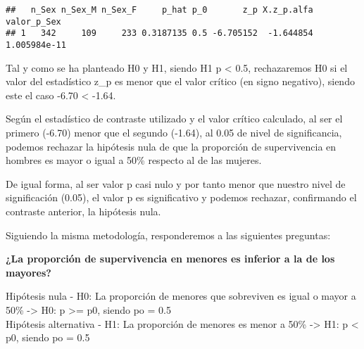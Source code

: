 \documentclass[
]{article}
\begin{document}
\begin{verbatim}
##   n_Sex n_Sex_M n_Sex_F     p_hat p_0       z_p X.z_p.alfa  valor_p_Sex
## 1   342     109     233 0.3187135 0.5 -6.705152  -1.644854 1.005984e-11
\end{verbatim}

Tal y como se ha planteado H0 y H1, siendo H1 p \textless{} 0.5,
rechazaremos H0 si el valor del estadístico z\_p es menor que el valor
crítico (en signo negativo), siendo este el caso -6.70 \textless{}
-1.64.

Según el estadístico de contraste utilizado y el valor crítico
calculado, al ser el primero (-6.70) menor que el segundo (-1.64), al
0.05 de nivel de significancia, podemos rechazar la hipótesis nula de
que la proporción de supervivencia en hombres es mayor o igual a 50\%
respecto al de las mujeres.

De igual forma, al ser valor p casi nulo y por tanto menor que nuestro
nivel de significación (0.05), el valor p es significativo y podemos
rechazar, confirmando el contraste anterior, la hipótesis nula.

Siguiendo la misma metodología, responderemos a las siguientes
preguntas:

\textbf{¿La proporción de supervivencia en menores es inferior a la de
los mayores?}

Hipótesis nula - H0: La proporción de menores que sobreviven es igual o
mayor a 50\% -\textgreater{} H0: p \textgreater= p0, siendo po = 0.5\\
Hipótesis alternativa - H1: La proporción de menores es menor a 50\%
-\textgreater{} H1: p \textless{} p0, siendo po = 0.5
\end{document}
